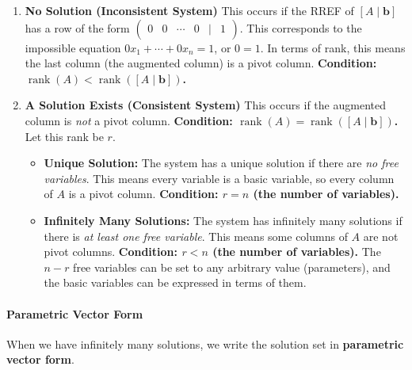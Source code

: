 \begin{enumerate}
    \item \textbf{No Solution (Inconsistent System)}
    This occurs if the RREF of $[A \mid \mathbf{b}]$ has a row of the form $\begin{pmatrix} 0 & 0 & \cdots & 0 & \mid & 1 \end{pmatrix}$.
    This corresponds to the impossible equation $0x_1 + \cdots + 0x_n = 1$, or $0 = 1$.
    In terms of rank, this means the last column (the augmented column) is a pivot column.
    \textbf{Condition: $\operatorname{rank}(A) < \operatorname{rank}([A \mid \mathbf{b}])$.}

    \item \textbf{A Solution Exists (Consistent System)}
    This occurs if the augmented column is \emph{not} a pivot column.
    \textbf{Condition: $\operatorname{rank}(A) = \operatorname{rank}([A \mid \mathbf{b}])$.} Let this rank be $r$.
    \begin{itemize}
        \item \textbf{Unique Solution:} The system has a unique solution if there are \emph{no free variables}. This means every variable is a basic variable, so every column of $A$ is a pivot column.
        \textbf{Condition: $r = n$ (the number of variables).}
        
        \item \textbf{Infinitely Many Solutions:} The system has infinitely many solutions if there is \emph{at least one free variable}. This means some columns of $A$ are not pivot columns.
        \textbf{Condition: $r < n$ (the number of variables).}
        The $n - r$ free variables can be set to any arbitrary value (parameters), and the basic variables can be expressed in terms of them.
    \end{itemize}
\end{enumerate}

\paragraph{Parametric Vector Form}
When we have infinitely many solutions, we write the solution set in \textbf{parametric vector form}.

